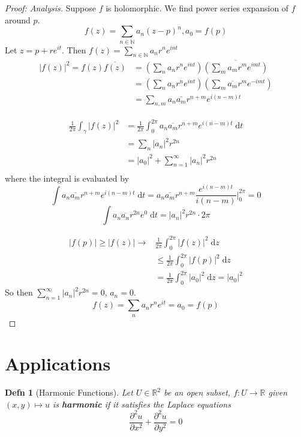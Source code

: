 \documentclass{article}
\newtheorem{definition}{Defn}
\begin{document}
\begin{proof}[Proof: Analysis]
Suppose $f$ is holomorphic. We find power series expansion of $f$ around $p$.
$$f(z) = \sum_{n \in \mathbb{N}} a_n (z-p)^n, a_0 = f(p)$$
Let $z = p + re^{it}$. Then $f(z) = \sum_{n \in \mathbb{N}} a_n r^n e^{int}$
\begin{equation*}
\begin{split}
|f(z)|^2 = f(z) \overline{f(z)} &= \left( \sum_n a_nr^ne^{int} \right) \overline{\left( \sum_m a_mr^me^{imt} \right)}\\
&= \left( \sum_n a_nr^ne^{int} \right) \left( \sum_m \overline{a_m}r^me^{-imt} \right)\\
&= \sum_{n,m} a_n \overline{a_m} r^{n + m} e^{i(n-m)t}
\end{split}
\end{equation*}

\begin{equation*}
\begin{split}
\frac{1}{2\pi} \int_\gamma |f(z)|^2 &= \frac{1}{2\pi} \int_0^{2\pi} a_n \overline{a_m} r^{n + m} e^{i(n-m)t} \;\mathrm{d}t\\
&= \sum_n |a_n|^2 r^{2n}\\
&= |a_0|^2 + \sum_{n=1}^\infty |a_n|^2 r^{2n}\\
\end{split}
\end{equation*}
where the integral is evaluated by
$$\int a_n \overline{a_m} r^{n + m} e^{i(n-m)t} \;\mathrm{d}t = a_n \overline{a_m} r^{n + m} \frac{e^{i(n-m)t}}{i(n-m)}\Big\vert_0^{2\pi} = 0$$
$$\int a_n \overline{a_n} r^{2n} e^0 \;\mathrm{d}t = |a_n|^2 r^{2n} \cdot 2\pi$$

\begin{equation*}
\begin{split}
|f(p)| \geq |f(z)| \to & \frac{1}{2\pi} \int_0^{2\pi} |f(z)|^2 \;\mathrm{d}z\\
&\leq \frac{1}{2\pi} \int_0^{2\pi} |f(p)|^2 \;\mathrm{d}z\\
&= \frac{1}{2\pi} \int_0^{2\pi} |a_0|^2 \;\mathrm{d}z = |a_0|^2
\end{split}
\end{equation*}
So then $\sum_{n=1}^\infty |a_n|^2 r^{2n} = 0$, $a_n = 0$.
$$f(z) = \sum_n a_nr^ne^{it} = a_0 = f(p)$$
\end{proof}

\section{Applications}
\begin{definition}[Harmonic Functions]
Let $U \in \mathbb{R}^2$ be an open subset, $f : U \to \mathbb{R}$ given $(x,y) \mapsto u$ is \textbf{harmonic} if it satisfies the Laplace equations
$$\frac{\partial^2 u}{\partial x^2} + \frac{\partial^2 u}{\partial y^2} = 0$$
\end{definition}
\end{document}
